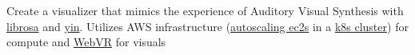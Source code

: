 {Create a visualizer that mimics the experience of Auditory Visual Synthesis with \href{https://librosa.org/}{librosa} and \href{http://audition.ens.fr/adc/pdf/2002_JASA_YIN.pdf}{yin}. Utilizes AWS infrastructure (\href{https://aws.amazon.com/ecs/}{autoscaling ec2s} in a \href{https://docs.aws.amazon.com/eks/latest/userguide/what-is-eks.html}{k8s cluster}) for compute and \href{https://developer.mozilla.org/en-US/docs/Games/Techniques/3D_on_the_web/WebVR}{WebVR} for visuals}
